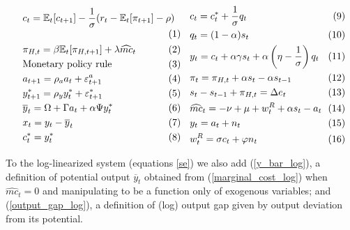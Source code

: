 \documentclass{article}
\newcommand{\Et}{\mathbb{E}_t}
\begin{document}
\begin{subequations}
\label{sistema_loglin}
    \begin{minipage}{0.49\textwidth}
        \begin{align}
            &c_t = \Et[c_{t+1}] - \frac{1}{\sigma} (r_t - \Et[\pi_{t+1}] - \rho) \label{euler_log}\\
            & \pi_{H,t} = \beta \Et[\pi_{H,t+1}] + \lambda \widehat{mc}_t \label{nkpc_log}\\
            & \text{Monetary policy rule}\\
            &a_{t+1} = \rho_a a_t + \varepsilon^a_{t+1} \label{tfp_log}\\
            &y^*_{t+1} = \rho_y y^*_t + \varepsilon^*_{t+1} \label{y_row_log}\\
            &\overline{y}_t = \Omega + \Gamma a_t + \alpha \Psi y_t^* \label{y_bar_log}\\
            &x_t = y_t - \overline{y}_t \label{output_gap_log}\\
            &c_t^* = y_t^* \label{world_equilibrium_log}
        \end{align}
        \end{minipage}
        \begin{minipage}{0.49\textwidth}
        \begin{align}
            &c_t = c_t^* + \frac{1}{\sigma} q_t \label{consumption_log}\\
            &q_t = (1-\alpha) s_t \label{real_rate_log}\\
            &y_t = c_t + \alpha \gamma s_t + \alpha \left( \eta - \frac{1}{\sigma} \right) q_t \label{output_st_log}\\
            &\pi_t = \pi_{H,t} + \alpha s_t - \alpha s_{t-1} \label{tot_log}\\
            &s_{t} - s_{t-1} + \pi_{H,t} = \Delta e_t \label{fx_log}\\
            &\widehat{mc}_{t} = -\nu + \mu + w_t^R + \alpha s_t - a_t \label{marginal_cost_log}\\
            &y_t = a_t +  n_t \label{technology_log}\\
            & w_t^R = \sigma c_t + \varphi n_t \label{labour_supply_log}
        \end{align}
    \end{minipage}
\end{subequations}

\vspace{6pt}
To the log-linearized system (equations \ref{se}) we also add (\ref{y_bar_log}), a definition of potential output $\overline{y}_t$ obtained from (\ref{marginal_cost_log}) when $\widehat{mc}_t = 0$ and manipulating to be a function only of exogenous variables; and (\ref{output_gap_log}), a definition of (log) output gap given by output deviation from its potential. 
\end{document}
